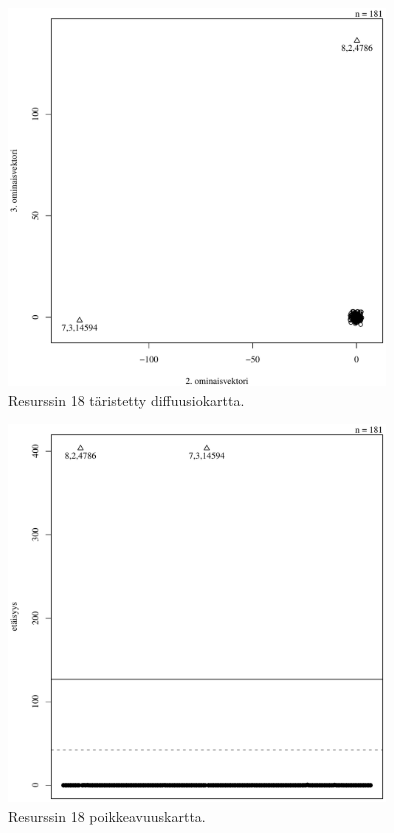 \begin{figure}[p]
\centering
\includegraphics[width=10cm]{pics/diffuusiokuvat/service_18.pdf}
\caption{Resurssin 18 täristetty diffuusiokartta.}
\label{diffuusio_18}
\end{figure}

\begin{figure}[p]
\centering
\includegraphics[width=10cm]{pics/tiheyskuvat/service_18.pdf}
\caption{Resurssin 18 poikkeavuuskartta.}
\label{service_18}
\end{figure}

